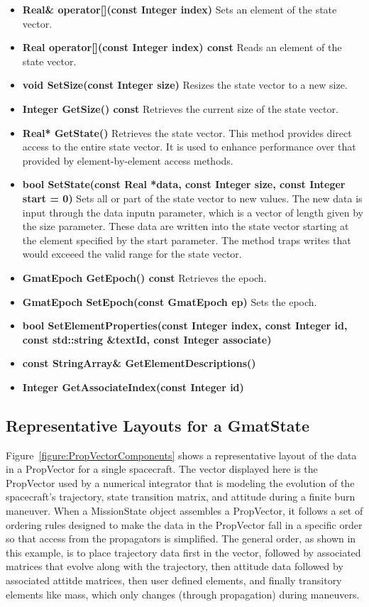 \begin{itemize}
\item\textbf{Real\& operator[](const Integer index)}  Sets an element of the state vector.
\item\textbf{Real operator[](const Integer index) const}  Reads an element of the state vector.
\item\textbf{void SetSize(const Integer size)}  Resizes the state vector to a new size.
\item\textbf{Integer GetSize() const} Retrieves the current size of the state vector.
\item\textbf{Real* GetState()}  Retrieves the state vector.  This method provides direct access to
the entire state vector.  It is used to enhance performance over that provided by element-by-element
access methods.
\item\textbf{bool SetState(const Real *data, const Integer size, const Integer start = 0)}  Sets
all or part of the state vector to new values.  The new data is input through the data inputn
parameter, which is a vector of length given by the size parameter.  These data are written into
the state vector starting at the element specified by the start parameter.  The method traps writes
that would exceeed the valid range for the state vector.
\item\textbf{GmatEpoch GetEpoch() const}  Retrieves the epoch.
\item\textbf{GmatEpoch SetEpoch(const GmatEpoch ep)}  Sets the epoch.
\item\textbf{bool SetElementProperties(const Integer index, const Integer id, const std::string
\&textId, const Integer associate)}
\item\textbf{const StringArray\& GetElementDescriptions()}
\item\textbf{Integer GetAssociateIndex(const Integer id)}
\end{itemize}

\subsection{\label{section:GmatStateSetup}Representative Layouts for a GmatState}

Figure~\ref{figure:PropVectorComponents} shows a representative layout of the data in a PropVector
for a single spacecraft.  The vector displayed here is the PropVector used by a numerical
integrator that is modeling the evolution of the spacecraft's trajectory, state transition matrix,
and attitude during a finite burn maneuver.  When a MissionState object assembles a PropVector, it
follows a set of ordering rules designed to make the data in the PropVector fall in a specific
order so that access from the propagators is simplified.  The general order, as shown in this
example, is to place trajectory data first in the vector, followed by associated matrices that
evolve along with the trajectory, then attitude data followed by associated attitde matrices, then
user defined elements, and finally transitory elements like mass, which only changes (through
propagation) during maneuvers.

